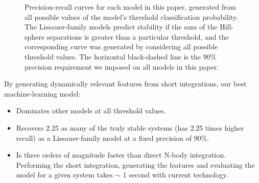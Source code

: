 \begin{figure}
 \centering {}
 \caption{
     Precision-recall curves for each model in this paper, generated from all possible values of the model's threshold classification probability.
     The Lissauer-family models predict stability if the sum of the Hill-sphere separations is greater than a particular threshold, and the corresponding curve was generated by considering all possible threshold values.
     The horizontal black-dashed line is the 90\% precision requirement we imposed on all models in this paper. 
    \label{prcurves}}
\end{figure}

By generating dynamically relevant features from short integrations, our best machine-learning model:
\begin{itemize}
	\item Dominates other models at all threshold values.
	\item Recovers 2.25 as many of the truly stable systems (has 2.25 times higher recall) as a Lissauer-family model at a fixed precision of 90\%.
	\item Is three orders of magnitude faster than direct N-body integration. Performing the short integration, generating the features and evaluating the model for a given system takes $\sim$ 1 second with current technology.
\end{itemize}


